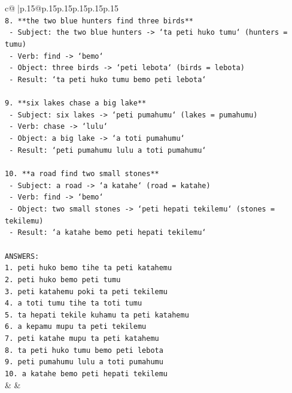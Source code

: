 \documentclass{article}
\begin{document}
{\begin{supertabular}{c@{$\;$}|p{.15\linewidth}@{}p{.15\linewidth}p{.15\linewidth}p{.15\linewidth}p{.15\linewidth}p{.15\linewidth}}
{{{\\ 
\texttt{8. **the two blue hunters find three birds**} \\
\texttt{   {-} Subject: the two blue hunters {-}> `ta peti huko tumu` (hunters = tumu)} \\
\texttt{   {-} Verb: find {-}> `bemo`} \\
\texttt{   {-} Object: three birds {-}> `peti lebota` (birds = lebota)} \\
\texttt{   {-} Result: `ta peti huko tumu bemo peti lebota`} \\
\\ 
\texttt{9. **six lakes chase a big lake**} \\
\texttt{   {-} Subject: six lakes {-}> `peti pumahumu` (lakes = pumahumu)} \\
\texttt{   {-} Verb: chase {-}> `lulu`} \\
\texttt{   {-} Object: a big lake {-}> `a toti pumahumu`} \\
\texttt{   {-} Result: `peti pumahumu lulu a toti pumahumu`} \\
\\ 
\texttt{10. **a road find two small stones**} \\
\texttt{    {-} Subject: a road {-}> `a katahe` (road = katahe)} \\
\texttt{    {-} Verb: find {-}> `bemo`} \\
\texttt{    {-} Object: two small stones {-}> `peti hepati tekilemu` (stones = tekilemu)} \\
\texttt{    {-} Result: `a katahe bemo peti hepati tekilemu`} \\
\\ 
\texttt{ANSWERS:} \\
\texttt{1. peti huko bemo tihe ta peti katahemu} \\
\texttt{2. peti huko bemo peti tumu} \\
\texttt{3. peti katahemu poki ta peti tekilemu} \\
\texttt{4. a toti tumu tihe ta toti tumu} \\
\texttt{5. ta hepati tekile kuhamu ta peti katahemu} \\
\texttt{6. a kepamu mupu ta peti tekilemu} \\
\texttt{7. peti katahe mupu ta peti katahemu} \\
\texttt{8. ta peti huko tumu bemo peti lebota} \\
\texttt{9. peti pumahumu lulu a toti pumahumu} \\
\texttt{10. a katahe bemo peti hepati tekilemu} \\
            }
        }
    }
    & & \\ \\


\end{supertabular}}
\end{document}
